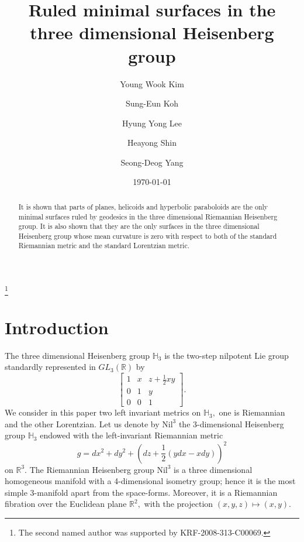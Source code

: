 \documentclass[11pt]{amsart}
\begin{document}
\title{Ruled minimal surfaces in the three dimensional Heisenberg
group}


\author[Y. W. Kim]{Young Wook Kim}
\address{Dept. of Mathematics, Korea University, Seoul, Korea 136-701}

\author[S.-E. Koh]{Sung-Eun Koh}
\address{Dept. of Mathematics, Konkuk University, Seoul, 143-701, Korea,}

\author[H. Y. Lee]{Hyung Yong Lee}
\address{Dept. of Mathematics, Korea University, Seoul, 143-701, Korea,}

\author[H. Shin]{Heayong Shin}
\address{Dept. of Mathematics, Chung-Ang University, Seoul, 156-756, Korea,}

\author[S.-D. Yang]{Seong-Deog Yang}
\address{Dept. of Mathematics, Korea University, Seoul, Korea 136-701}

\date{\today}
\thanks{
The second named author was supported by KRF-2008-313-C00069.}

\begin{abstract}
It is shown that parts of planes, helicoids and hyperbolic
paraboloids are the only minimal surfaces ruled by geodesics in
the three dimensional Riemannian Heisenberg group.
 It is also shown that they are the only surfaces in the three
dimensional Heisenberg group whose mean curvature is zero with
respect to both of the standard Riemannian metric and the standard
Lorentzian metric.
\end{abstract}

\maketitle

\section{Introduction}

The three dimensional Heisenberg group ${\mathbb{H}}_3$ is the two-step
nilpotent Lie group standardly represented in $GL_3({\mathbb{R}})$ by
$$
\left[
\begin{array}{ccc}1&x&z+\frac12xy\\0&1&y\\0&0&1\end{array}\right].
$$
We consider in this paper two left invariant metrics on ${\mathbb{H}}_3,$
one is Riemannian and the other Lorentzian.
Let us denote by
$\text{Nil}^3$ the 3-dimensional Heisenberg group ${\mathbb{H}}_3$ endowed
with the left-invariant Riemannian metric
$$
g=dx^2+dy^2+\left(dz+\frac12(ydx-xdy)\right)^2
$$
on ${\mathbb{R}}^3.$ The Riemannian Heisenberg group $\text{Nil}^3$ is a
three dimensional homogeneous manifold with a 4-dimensional
isometry group; hence it is the most simple 3-manifold apart from
the space-forms.
Moreover, it is a Riemannian fibration over the Euclidean plane
${\mathbb{R}}^2,$ with the projection $(x,y,z)\mapsto (x,y).$
\end{document}
